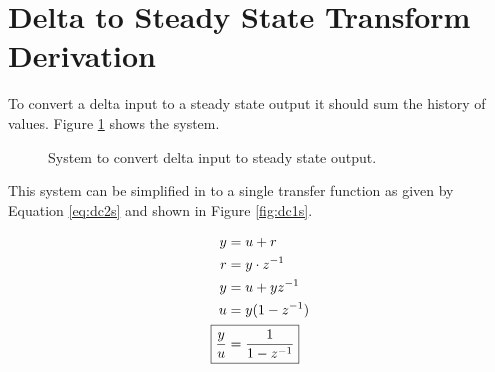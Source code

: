 \documentclass{article}
\begin{document}




\clearpage





\clearpage
\section{Delta to Steady State Transform Derivation}
\label{app:dsderiv}

To convert a delta input to a steady state output it should
sum the history of values.
Figure \ref{fig:dc1} shows the system.

\begin{figure}[hpb!]
\begin{center}


\end{center}

\caption{System to convert delta input to steady state output.}
\label{fig:dc1}
\end{figure}

This system can be simplified in to a single transfer function
as given by Equation \ref{eq:dc2s} and shown in Figure \ref{fig:dc1s}.

\begin{align}
	y &= u + r \notag \\
	r &= y \cdot z^{-1} \notag \\
	y &= u + y z^{-1} \notag \\
	u &= y(1 - z^{-1}) \notag \\
	\Aboxed{ \frac{y}{u} &= \frac{1}{1 - z^{-1}} } \label{eq:dc2s}
\end{align}
\end{document}
